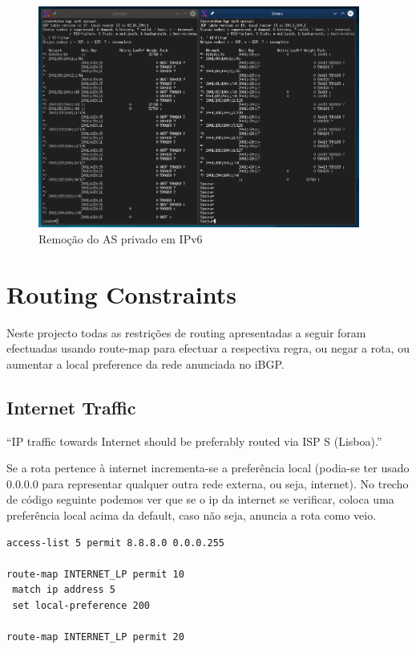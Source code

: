 \documentclass[11pt,a4paper]{report}
\begin{document}
\begin{figure}[H]
\centerline{\includegraphics[width=300pt]{private_as_removal_ipv6.png}}
\caption{Remoção do AS privado em IPv6}
\label{schema}
\end{figure}


\section{Routing Constraints}

Neste projecto todas as restrições de routing apresentadas a seguir foram efectuadas usando route-map para efectuar a respectiva regra, ou negar a rota, ou aumentar a local preference da rede anunciada no iBGP.

\subsection{Internet Traffic}

``IP traffic towards Internet should be preferably routed via ISP S (Lisboa).''
\newline

Se a rota pertence à internet incrementa-se a preferência local (podia-se ter usado 0.0.0.0 para representar qualquer outra rede externa, ou seja, internet). No trecho de código seguinte podemos ver que se o ip da internet se verificar, coloca uma preferência local acima da default, caso não seja, anuncia a rota como veio.

\begin{lstlisting}[caption=Route-map para a Internet]
access-list 5 permit 8.8.8.0 0.0.0.255

route-map INTERNET_LP permit 10
 match ip address 5
 set local-preference 200

route-map INTERNET_LP permit 20
\end{lstlisting}
\end{document}
